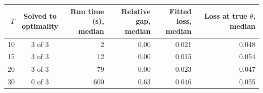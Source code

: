 \begin{tabular}{rcrrrr}\toprule
$T$ & \hd{Solved to\\optimality} & \hd{Run time (s),\\median} & \hd{Relative gap,\\median} & \hd{Fitted loss,\\median} & \hd{Loss at\\true $\theta$, median}\\\midrule
10 & 3 of 3 & 2 & 0.00 & 0.021 & 0.048\\
15 & 3 of 3 & 12 & 0.00 & 0.015 & 0.054\\
20 & 3 of 3 & 79 & 0.00 & 0.023 & 0.047\\
30 & 0 of 3 & 600 & 0.63 & 0.046 & 0.055\\
\bottomrule\end{tabular}